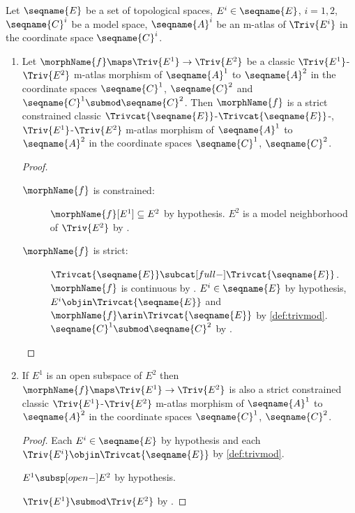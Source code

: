 \documentclass{article}
\begin{document}
\begin{lemma}
\label{lem:M-ATLcmorph}
Let $\seqname{E}$ be a set of topological spaces,
$E^i \in \seqname{E}$, $i=1,2$,
$\seqname{C}^i$ be a model space,
$\seqname{A}^i$ be an m-atlas of $\Triv{E^i}$ in the coordinate space
$\seqname{C}^i$.

\begin{enumerate}
\item
Let $\morphName{f} \maps \Triv{E^1} \to \Triv{E^2}$ be a classic
$\Triv{E^1}$-$\Triv{E^2}$ m-atlas morphism of $\seqname{A}^1$ to
$\seqname{A}^2$ in the coordinate spaces $\seqname{C}^1$,
$\seqname{C}^2$ and $\seqname{C}^1 \submod \seqname{C}^2$. Then
$\morphName{f}$ is a strict constrained classic
\nobreaks
  {
    {$\Trivcat{\seqname{E}}$-$\Trivcat{\seqname{E}}$-},
    {$\Triv{E^1}$-$\Triv{E^2}$}
  }
m-atlas morphism of $\seqname{A}^1$ to $\seqname{A}^2$ in the coordinate
spaces $\seqname{C}^1$, $\seqname{C}^2$.

\begin{proof}
\leavevmode
\begin{description}
\item[$\morphName{f}$ is constrained:]
\leavevmode
$\morphName{f}[E^1] \subseteq E^2$ by hypothesis.
$E^2$ is a model neighborhood of $\Triv{E^2}$ by .
\item[$\morphName{f}$ is strict:]
\leavevmode
$\Trivcat{\seqname{E}} \subcat[full-] \Trivcat{\seqname{E}}$.
$\morphName{f}$ is continuous by .
$E^i \in \seqname{E}$ by hypothesis,
$E^i \objin  \Trivcat{\seqname{E}}$ and
$\morphName{f} \arin \Trivcat{\seqname{E}}$ by \cref{def:trivmod}.
$\seqname{C}^1 \submod \seqname{C}^2$
by .
\end{description}
\end{proof}

\item
If $E^1$ is an open subspace of $E^2$ then
$\morphName{f} \maps \Triv{E^1} \to \Triv{E^2}$ is also a strict
constrained classic $\Triv{E^1}$-$\Triv{E^2}$ m-atlas morphism of
$\seqname{A}^1$ to $\seqname{A}^2$ in the coordinate spaces
$\seqname{C}^1$, $\seqname{C}^2$.

\begin{proof}
Each $E^i \in \seqname{E}$ by hypothesis and each
$\Triv{E^i} \objin \Trivcat{\seqname{E}}$ by \cref{def:trivmod}.

$E^1 \subsp[open-] E^2$ by hypothesis.

$\Triv{E^1} \submod \Triv{E^2}$ by .


\end{proof}
\end{enumerate}
\end{lemma}
\end{document}
